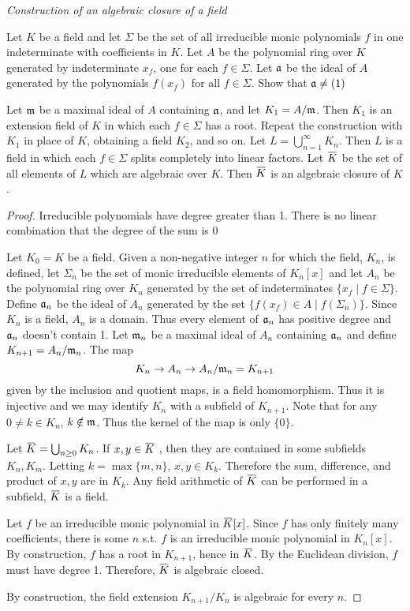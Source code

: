 \documentclass[11pt]{article}
\begin{document}
\emph{Construction of an algebraic closure of a field}
\begin{exercise}
\label{ex1.13}
Let \(K\) be a field and let \(\Sigma\) be the set of all irreducible monic polynomials \(f\) in one
indeterminate with coefficients in \(K\). Let \(A\) be the polynomial ring over \(K\) generated
by indeterminate \(x_f\), one for each \(f\in\Sigma\). Let \(\mathfrak{a}\) be the ideal of \(A\) generated by the
polynomials \(f(x_f)\) for all \(f\in\Sigma\). Show that \(\mathfrak{a}\neq(1)\)

Let \(\mathfrak{m}\) be a maximal ideal of \(A\) containing \(\mathfrak{a}\), and let \(K_1=A/\mathfrak{m}\). Then \(K_1\) is an
extension field of \(K\) in which each \(f\in\Sigma\) has a root. Repeat the construction with \(K_1\)
in place of \(K\), obtaining a field \(K_2\), and so on. Let \(L=\bigcup_{n=1}^\infty K_n\). Then \(L\) is a
field in which each \(f\in\Sigma\) splits completely into linear factors. Let \(\barK\) be the set of
all elements of \(L\) which are algebraic over \(K\). Then \(\barK\) is an algebraic closure of \(K\).
\end{exercise}

\begin{proof}
Irreducible polynomials have degree greater than 1. There is no linear combination that the
degree of the sum is 0

Let \(K_0=K\) be a field. Given a non-negative integer \(n\) for which the field, \(K_n\), is
defined, let \(\Sigma_n\) be the set of monic irreducible elements of \(K_n[x]\) and let \(A_n\) be
the polynomial ring over \(K_n\) generated by the set of indeterminates \(\{x_f\mid f\in\Sigma\}\).
Define \(\mathfrak{a}_n\) be the ideal of \(A_n\) generated by the set \(\{f(x_f)\in A\mid f(\Sigma_n)\}\).
Since \(K_n\) is a field, \(A_n\) is a domain. Thus every element of \(\mathfrak{a}_n\) has positive degree
and \(\mathfrak{a}_n\) doesn't contain 1. Let \(\mathfrak{m}_n\) be a maximal ideal of \(A_n\) containing \(\mathfrak{a}_n\) and
define \(K_{n+1}=A_n/\mathfrak{m}_n\). The map
\begin{equation*}
K_n\to A_n\to A_n/\mathfrak{m}_n=K_{n+1}
\end{equation*}
given by the inclusion and quotient maps, is a field homomorphism. Thus it is injective and we
may identify \(K_n\) with a subfield of \(K_{n+1}\). Note that for any \(0\neq k\in K_n\), \(k\notin\mathfrak{m}\).
Thus the kernel of the map is only \(\{0\}\).

Let \(\barK=\bigcup_{n\ge 0}K_n\). If \(x,y\in\barK\) , then they are contained in some
subfields \(K_n,K_m\). Letting \(k=\max\{m,n\}\), \(x,y\in K_k\). Therefore the sum, difference, and
product of \(x,y\) are in \(K_k\).  Any field arithmetic of \(\barK\) can be performed in a
subfield, \(\barK\) is a field.

Let \(f\) be an irreducible monic polynomial in \(\barK[x]\). Since \(f\) has only finitely many
coefficients, there is some \(n\) s.t. \(f\) is an irreducible monic polynomial in \(K_n[x]\).
By construction, \(f\) has a root in \(K_{n+1}\), hence in \(\barK\). By the Euclidean
division, \(f\) must have degree 1. Therefore, \(\barK\) is algebraic closed.

By construction, the field extension \(K_{n+1}/K_n\) is algebraic for every \(n\).
\end{proof}
\end{document}
